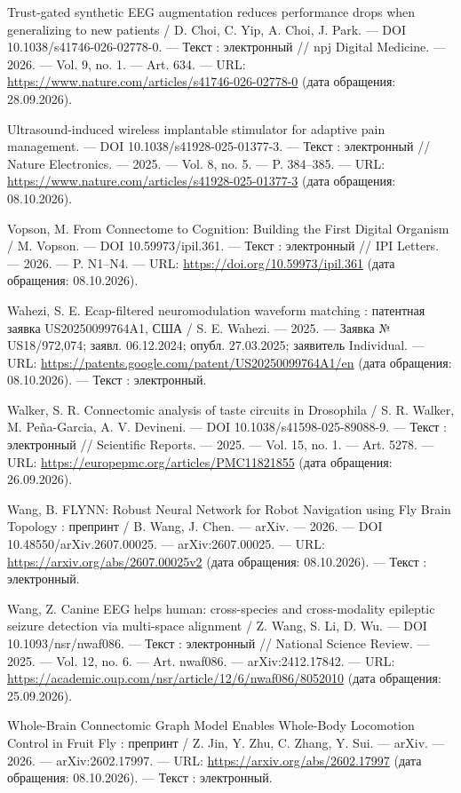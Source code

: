 \begin{list}{}{\setlength{\leftmargin}{10mm}\setlength{\labelwidth}{8mm}\setlength{\labelsep}{2mm}\setlength{\itemsep}{0pt}\setlength{\parsep}{0pt}\setlength{\topsep}{0pt}}
\item[289.] Trust-gated synthetic EEG augmentation reduces performance drops when generalizing to new patients / D. Choi, C. Yip, A. Choi, J. Park. — DOI 10.1038/s41746-026-02778-0. — Текст : электронный // npj Digital Medicine. — 2026. — Vol. 9, no. 1. — Art. 634. — URL: \url{https://www.nature.com/articles/s41746-026-02778-0} (дата обращения: 28.09.2026).
\item[290.] Ultrasound-induced wireless implantable stimulator for adaptive pain management. — DOI 10.1038/s41928-025-01377-3. — Текст : электронный // Nature Electronics. — 2025. — Vol. 8, no. 5. — P. 384–385. — URL: \url{https://www.nature.com/articles/s41928-025-01377-3} (дата обращения: 08.10.2026).
\item[291.] Vopson, M. From Connectome to Cognition: Building the First Digital Organism / M. Vopson. — DOI 10.59973/ipil.361. — Текст : электронный // IPI Letters. — 2026. — P. N1–N4. — URL: \url{https://doi.org/10.59973/ipil.361} (дата обращения: 08.10.2026).
\item[292.] Wahezi, S. E. Ecap-filtered neuromodulation waveform matching : патентная заявка US20250099764A1, США / S. E. Wahezi. — 2025. — Заявка № US18/972,074; заявл. 06.12.2024; опубл. 27.03.2025; заявитель Individual. — URL: \url{https://patents.google.com/patent/US20250099764A1/en} (дата обращения: 08.10.2026). — Текст : электронный.
\item[293.] Walker, S. R. Connectomic analysis of taste circuits in Drosophila / S. R. Walker, M. Peña-Garcia, A. V. Devineni. — DOI 10.1038/s41598-025-89088-9. — Текст : электронный // Scientific Reports. — 2025. — Vol. 15, no. 1. — Art. 5278. — URL: \url{https://europepmc.org/articles/PMC11821855} (дата обращения: 26.09.2026).
\item[294.] Wang, B. FLYNN: Robust Neural Network for Robot Navigation using Fly Brain Topology : препринт / B. Wang, J. Chen. — arXiv. — 2026. — DOI 10.48550/arXiv.2607.00025. — arXiv:2607.00025. — URL: \url{https://arxiv.org/abs/2607.00025v2} (дата обращения: 08.10.2026). — Текст : электронный.
\item[295.] Wang, Z. Canine EEG helps human: cross-species and cross-modality epileptic seizure detection via multi-space alignment / Z. Wang, S. Li, D. Wu. — DOI 10.1093/nsr/nwaf086. — Текст : электронный // National Science Review. — 2025. — Vol. 12, no. 6. — Art. nwaf086. — arXiv:2412.17842. — URL: \url{https://academic.oup.com/nsr/article/12/6/nwaf086/8052010} (дата обращения: 25.09.2026).
\item[296.] Whole-Brain Connectomic Graph Model Enables Whole-Body Locomotion Control in Fruit Fly : препринт / Z. Jin, Y. Zhu, C. Zhang, Y. Sui. — arXiv. — 2026. — arXiv:2602.17997. — URL: \url{https://arxiv.org/abs/2602.17997} (дата обращения: 08.10.2026). — Текст : электронный.

\end{list}
